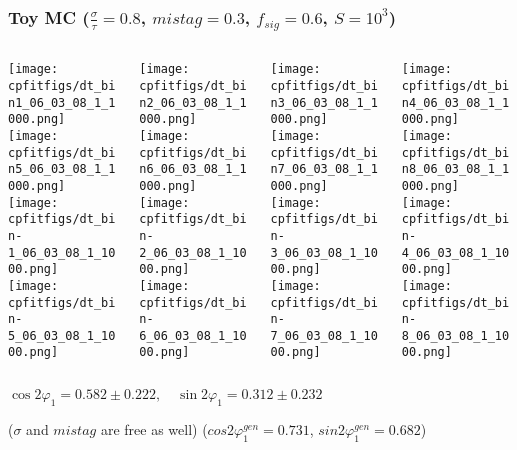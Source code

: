 \documentclass[10 pt,compress,mathserif]{beamer}
\begin{document}
\begin{frame}
 \frametitle{Toy MC ($\frac{\sigma}{\tau}=0.8$, $mistag = 0.3$, $f_{sig} = 0.6$, $S = 10^3$)}
 \begin{columns}
  \begin{column}{0.25\textwidth}
   \texttt{[image: cpfitfigs/dt\_bin1\_06\_03\_08\_1\_1000.png]}\\
   \texttt{[image: cpfitfigs/dt\_bin5\_06\_03\_08\_1\_1000.png]}\\
   \texttt{[image: cpfitfigs/dt\_bin-1\_06\_03\_08\_1\_1000.png]}\\
   \texttt{[image: cpfitfigs/dt\_bin-5\_06\_03\_08\_1\_1000.png]}
  \end{column}
  \begin{column}{0.25\textwidth}
   \texttt{[image: cpfitfigs/dt\_bin2\_06\_03\_08\_1\_1000.png]}\\
   \texttt{[image: cpfitfigs/dt\_bin6\_06\_03\_08\_1\_1000.png]}\\
   \texttt{[image: cpfitfigs/dt\_bin-2\_06\_03\_08\_1\_1000.png]}\\
   \texttt{[image: cpfitfigs/dt\_bin-6\_06\_03\_08\_1\_1000.png]}
  \end{column}
  \begin{column}{0.25\textwidth}
   \texttt{[image: cpfitfigs/dt\_bin3\_06\_03\_08\_1\_1000.png]}\\
   \texttt{[image: cpfitfigs/dt\_bin7\_06\_03\_08\_1\_1000.png]}\\
   \texttt{[image: cpfitfigs/dt\_bin-3\_06\_03\_08\_1\_1000.png]}\\
   \texttt{[image: cpfitfigs/dt\_bin-7\_06\_03\_08\_1\_1000.png]}
  \end{column}
  \begin{column}{0.25\textwidth}
   \texttt{[image: cpfitfigs/dt\_bin4\_06\_03\_08\_1\_1000.png]}\\
   \texttt{[image: cpfitfigs/dt\_bin8\_06\_03\_08\_1\_1000.png]}\\
   \texttt{[image: cpfitfigs/dt\_bin-4\_06\_03\_08\_1\_1000.png]}\\
   \texttt{[image: cpfitfigs/dt\_bin-8\_06\_03\_08\_1\_1000.png]}
  \end{column}
 \end{columns}
 \begin{center}
  $\cos{2\varphi_1} = 0.582 \pm 0.222,\quad \sin{2\varphi_1} = 0.312 \pm 0.232$

  ($\sigma$ and $mistag$ are free as well)  ($cos2\varphi^{gen}_1 = 0.731$, $sin2\varphi^{gen}_1 = 0.682$)
 \end{center}
\end{frame}
\end{document}
